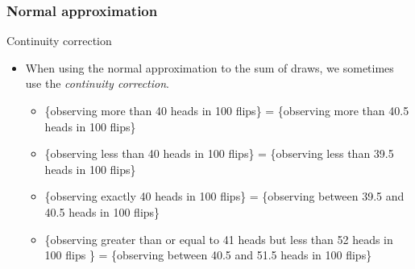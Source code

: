 \documentclass[handout]{beamer}
\begin{document}

   \begin{frame} \frametitle{Normal approximation}

   \begin{block}
   {Continuity correction}
   \begin{itemize}
   \item When using the normal approximation to the sum of draws,
     we sometimes use the {\em continuity correction}.
     \begin{itemize}
     \item \{observing more than 40 heads in 100 flips\} =
     \{observing more than 40.5 heads in 100 flips\}

     \item \{observing less than 40 heads in 100 flips\}
      = \{observing less than 39.5 heads in 100 flips\}

      \item \{observing exactly 40 heads in 100 flips\} =
       \{observing between 39.5 and 40.5 heads in 100 flips\}
      \item \{observing greater than or equal to 41 heads but less
       than 52 heads in 100 flips \} = \{observing between 40.5 and 51.5 heads in 100 flips\}
     \end{itemize}

     \end{itemize}

   \end{block}
   \end{frame}

\end{document}
